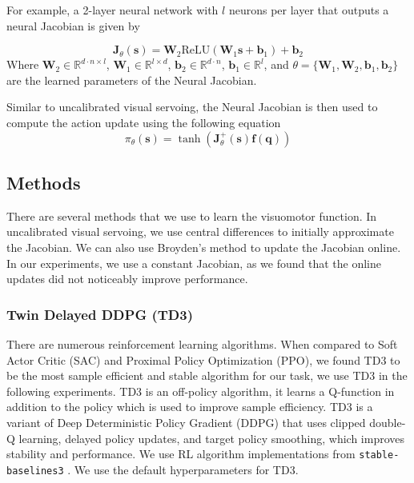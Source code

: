 \documentclass[letterpaper, 10 pt, conference]{ieeeconf}  %
\begin{document}
For example, a 2-layer neural network with $l$ neurons per layer that outputs
a neural Jacobian is given by

\begin{equation}
    \mathbf{J}_\theta(\mathbf{s}) = \mathbf{W}_2 \text{ReLU}(\mathbf{W}_1 \mathbf{s} + \mathbf{b}_1) + \mathbf{b}_2
\end{equation}
Where $\mathbf{W}_2 \in \mathbb{R}^{d \cdot n \times l}$, $\mathbf{W}_1 \in \mathbb{R}^{l \times d}$,
$\mathbf{b}_2 \in \mathbb{R}^{d \cdot n}$, $\mathbf{b}_1 \in \mathbb{R}^{l}$, and
$\theta = \{\mathbf{W}_1, \mathbf{W}_2, \mathbf{b}_1, \mathbf{b}_2\}$
are the learned parameters of the Neural Jacobian.

Similar to uncalibrated visual servoing, the Neural Jacobian is then used to
compute the action update using the following equation
\begin{equation}
    \pi_\theta(\mathbf{s}) = \tanh(\mathbf{J}_\theta^{+}(\mathbf{s}) \mathbf{f}(\mathbf{q}))
\end{equation}

\subsection{Methods}

There are several methods that we use to learn the visuomotor function. In uncalibrated
visual servoing, we use central differences to initially approximate the Jacobian. We
can also use Broyden's method to update the Jacobian online. In our experiments,
we use a constant Jacobian, as we found that the online updates did not noticeably
improve performance.

\subsubsection{Twin Delayed DDPG (TD3)}

There are numerous reinforcement learning algorithms. When compared
to Soft Actor Critic (SAC) and Proximal Policy Optimization (PPO), we found TD3 to be the most sample efficient and stable
algorithm for our task, we use TD3 in the following experiments. TD3 is an
off-policy algorithm, it learns a Q-function in addition to the policy which is
used to improve sample efficiency. TD3 is a variant of Deep Deterministic Policy Gradient (DDPG) that uses clipped
double-Q learning, delayed policy updates, and target policy smoothing, which
improves stability and performance. \cite{Fujimoto2018} We use RL algorithm
implementations from \texttt{stable-baselines3} \cite{Raffin2021}. We use
the default hyperparameters for TD3.
\end{document}
